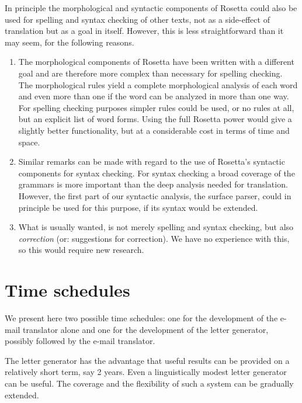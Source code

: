 In principle the morphological and syntactic components of Rosetta could also 
be used for spelling  and syntax checking of other texts, not as a 
side-effect 
of translation but as a goal in itself. However, this is less straightforward
than it may seem, for the following reasons.

\begin{enumerate}

\item The morphological components of Rosetta have been written 
with a different goal and are therefore more complex than necessary for 
spelling checking. The morphological rules yield a complete 
morphological analysis of each word and even more than one if the word can be 
analyzed in more than one way. 
For spelling checking purposes simpler rules could be used,
or no rules at all, but an explicit list of word forms.  
Using the full Rosetta power would give a slightly better functionality, but at 
a considerable cost in terms of time and space.



\item Similar remarks can be made with regard to the use of Rosetta's syntactic 
components for syntax checking. For syntax checking a broad coverage of the
grammars is more 
important than the deep analysis needed for translation. However, the first 
part of our syntactic analysis, the surface parser, could in principle be used 
for this purpose, if its syntax would be extended.

\item What is usually wanted, is not merely spelling and syntax checking, but 
also {\em correction} (or: suggestions for correction). We have no experience 
with this, so this would require new research.


\end{enumerate}


\section{Time schedules}


We present here two possible time schedules: one for the development of
the e-mail translator alone and one for the development of the letter 
generator, 
possibly followed by the e-mail translator.

The letter generator has the advantage that useful results can be provided
on a relatively short term, say 2 years. Even a linguistically modest
letter generator can be useful. The coverage and the 
flexibility of such a system can be gradually extended. 

